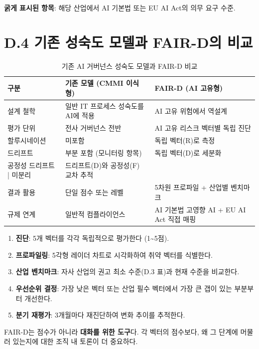 \textbf{굵게 표시된 항목}: 해당 산업에서 AI 기본법 또는 EU AI Act의 의무 요구 수준.

\section*{D.4 기존 성숙도 모델과 FAIR-D의 비교}

\begin{table}[htbp]
\centering
\caption{기존 AI 거버넌스 성숙도 모델과 FAIR-D 비교}
\label{tab:faird_comparison}
\begin{tabularx}{\textwidth}{|l|X|X|}
\hline
\textbf{구분} & \textbf{기존 모델 (CMMI 이식형)} & \textbf{FAIR-D (AI 고유형)} \\ \hline
설계 철학 & 일반 IT 프로세스 성숙도를 AI에 적용 & AI 고유 위험에서 역설계 \\ \hline
평가 단위 & 전사 거버넌스 전반 & AI 고유 리스크 벡터별 독립 진단 \\ \hline
할루시네이션 & 미포함 & 독립 벡터(R)로 측정 \\ \hline
드리프트 & 부분 포함 (모니터링 항목) & 독립 벡터(D)로 세분화 \\ \hline
공정성 드리프트 | 미분리 & 드리프트(D)와 공정성(F) 교차 추적 \\ \hline
결과 활용 & 단일 점수 또는 레벨 & 5차원 프로파일 + 산업별 벤치마크 \\ \hline
규제 연계 & 일반적 컴플라이언스 & AI 기본법 고영향 AI + EU AI Act 직접 매핑 \\ \hline
\end{tabularx}
\end{table}

\begin{tcolorbox}[colback=blue!5!white, colframe=blue!75!black, title={\textbf{FAIR-D 활용 가이드}}]
\begin{enumerate}
    \item \textbf{진단}: 5개 벡터를 각각 독립적으로 평가한다 (1\textasciitilde{}5점).
    \item \textbf{프로파일링}: 5각형 레이더 차트로 시각화하여 취약 벡터를 식별한다.
    \item \textbf{산업 벤치마크}: 자사 산업의 권고 최소 수준(D.3 표)과 현재 수준을 비교한다.
    \item \textbf{우선순위 결정}: 가장 낮은 벡터 또는 산업 필수 벡터에서 가장 큰 갭이 있는 부분부터 개선한다.
    \item \textbf{분기 재평가}: 3개월마다 재진단하여 변화 추이를 추적한다.
\end{enumerate}
FAIR-D는 점수가 아니라 \textbf{대화를 위한 도구}다. 각 벡터의 점수보다, 왜 그 단계에 머물러 있는지에 대한 조직 내 토론이 더 중요하다.
\end{tcolorbox}
